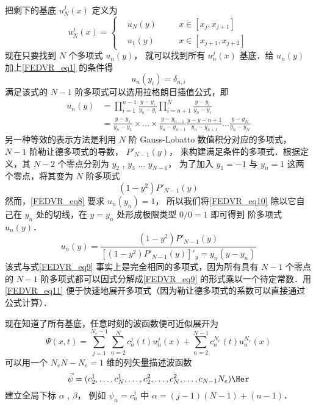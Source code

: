 把剩下的基底 $u_N^j(x)$ 定义为
\begin{equation}
u_N^j(x) = \left\{\begin{aligned}
&u_N(y) \quad &&x\in[x_j,x_{j+1}] \\
&u_1(y)  &&x\in[x_{j+1},x_{j+2}]
\end{aligned}\right.
\end{equation}
现在只要找到 $N$ 个多项式 $u_n(y)$， 就可以找到所有 $u_n^j(x)$ 基底．给 $u_n(y)$ 加上\autoref{FEDVR_eq1} 的条件得
\begin{equation}\label{FEDVR_eq8}
u_n(y_i) = \delta_{n,i}
\end{equation}
满足该式的 $N-1$ 阶多项式可以选用拉格朗日插值公式，即
\begin{equation}\label{FEDVR_eq9}\begin{aligned}
u_n(y) &= \prod_{i=1}^{n-1} \frac{y-y_i}{y_n-y_i} \prod_{i=n+1}^{N} \frac{y-y_i}{y_n-y_i}\\
&= \frac{y-y_1}{y_n-y_1} \times\dots\times\frac{y-y_{n-1}}{y_n-y_{n-1}}\frac{y-y-{n+1}}{y_n-y_{n+1}} \dots \frac{y-y_N}{y_n-y_N}
\end{aligned}\end{equation}
另一种等效的表示方法是利用 $N$ 阶 Gauss-Lobatto 数值积分对应的多项式， $N-1$ 阶勒让德多项式的导数， $P'_{N-1}(y)$，  来构建满足条件的多项式．根据定义，其 $N-2$ 个零点分别为 $y_2$ , $y_3$ ... $y_{N-1}$， 为了加入 $y_1=-1$ 与 $y_n=1$ 这两个零点，将其变为 $N$ 阶多项式
\begin{equation}\label{FEDVR_eq10}
(1-y^2)P'_{N-1}(y)
\end{equation}
然而，\autoref{FEDVR_eq8} 要求 $u_n(y_n)=1$， 所以我们将\autoref{FEDVR_eq10} 除以它自己在 $y_n$ 处的切线，在 $y=y_n$ 处形成极限类型 $0/0=1$ 即可得到 阶多项式 $u_n(y)$． 
\begin{equation}\label{FEDVR_eq11}
u_n(y) = \frac{(1-y^2)P'_{N-1}(y)}{\left[(1-y^2)P'_{N-1}(y)\right]'_y=y_n (y-y_n)}
\end{equation}
该式与式\autoref{FEDVR_eq9} 事实上是完全相同的多项式，因为所有具有 $N-1$ 个零点的 $N-1$ 阶多项式都可以因式分解成\autoref{FEDVR_eq9} 的形式乘以一个待定常数．用\autoref{FEDVR_eq11} 便于快速地展开多项式（因为勒让德多项式的系数可以直接通过公式计算）．

现在知道了所有基底，任意时刻的波函数便可近似展开为
\begin{equation}
\Psi(x,t) = \sum_{j=1}^{N_e-1}\sum_{n=2}^{N} c_n^j(t) u_n^j(x) + \sum_{n=2}^{N-1} c_n^{N_e}(t) u_n^{N_e}(x)
\end{equation}
可以用一个 $N_eN-N_e=1$ 维的列矢量描述波函数
\begin{equation}
\vec\psi = {(c_2^1,\dots,c_N^1,\dots,c_2^2,\dots,c_N^2,\dots,c_{N-1}{N_e})}\Her
\end{equation}
建立全局下标 $\alpha$ , $\beta$， 例如 $\psi_\alpha=c_n^j$ 中 $\alpha=(j-1)(N-1)+(n-1)$． 

